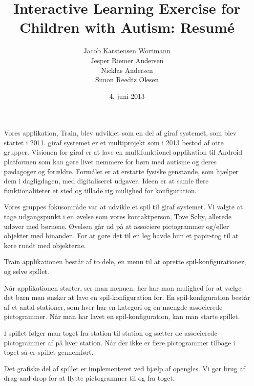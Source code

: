 \documentclass[10pt]{article}
\title{Interactive Learning Exercise for Children with Autism: Resumé}
\author{Jacob Karstensen Wortmann\\Jesper Riemer Andersen\\Nicklas Andersen\\Simon Reedtz Olesen}
\date{4. juni 2013}
\begin{document}
\maketitle

Vores applikation, Train, blev udviklet som en del af \ac{giraf} systemet, som blev startet i 2011. \ac{giraf} systemet er et multiprojekt som i 2013 bestod af otte grupper. Visionen for \ac{giraf} er at lave en multifunktionel applikation til Android platformen som kan gøre livet nemmere for børn med autisme og deres pædagoger og forældre. Formålet er at erstatte fysiske genstande, som hjælper dem i dagligdagen, med digitaliseret udgaver. Ideen er at samle flere funktionaliteter et sted og tillade rig mulighed for konfiguration.

Vores gruppes fokusområde var at udvikle et spil til \ac{giraf} systemet. Vi valgte at tage udgangspunkt i en øvelse som vores kontaktperson, Tove Søby, allerede udøver med børnene. Øvelsen går ud på at associere pictogrammer og/eller objekter med hinanden. For at gøre det til en leg havde hun et papir-tog til at køre rundt med objekterne.

Train applikationen består af to dele, en menu til at oprette spil-konfigurationer, og selve spillet. 

Når applikationen starter, ser man menuen, her har man mulighed for at vælge det barn man ønsker at lave en spil-konfiguration for. En spil-konfiguration består af et antal stationer, som hver har en kategori og en mængde associerede pictogrammer. Når man har lavet en spil-konfiguration, kan man starte spillet.

I spillet følger man toget fra station til station og sætter de associerede pictogrammer af på hver station. Når der ikke er flere pictogrammer tilbage i toget så er spillet gennemført.

Det grafiske del af spillet er implementeret ved hjælp af \acl{opengles}. Vi gør brug af drag-and-drop for at flytte pictogrammer til og fra toget.
\end{document}
